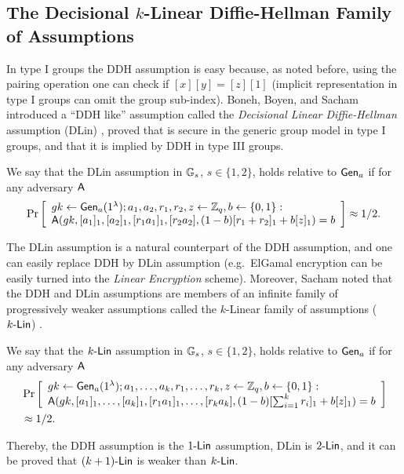 \subsection{The Decisional $k$-Linear Diffie-Hellman Family of Assumptions}
In type I groups the DDH assumption is easy because, as noted before, using the pairing operation one can check if $[x][y]=[z][1]$ (implicit representation in type I groups can omit the group sub-index). Boneh, Boyen, and Sacham introduced a ``DDH like'' assumption called the \emph{Decisional Linear Diffie-Hellman} assumption (DLin) \cite{C:BonBoySha04}, proved that is secure in the generic group model in type I groups, and that it is implied by DDH in type III groups. 

\begin{definition}
We say that the DLin assumption in $\mathbb{G}_s$, $s\in\{1,2\}$, holds relative to $\mathsf{Gen}_a$ if for any adversary $\mathsf{A}$
$$
\Pr\left[\begin{array}{l}
gk\gets\mathsf{Gen}_a(1^\lambda);a_1,a_2,r_1,r_2,z\gets\mathbb{Z}_q,b\gets\{0,1\}:\\
\mathsf{A}(gk,[a_1]_1,[a_2]_1,[r_1a_1]_1,[r_2a_2],(1-b)[r_1+r_2]_1+b[z]_1)=b
\end{array}\right]\approx 1/2.
$$
\end{definition}

The DLin assumption is a natural counterpart of the DDH assumption, and one can easily replace DDH by DLin assumption (e.g.~ElGamal encryption can be easily turned into the \emph{Linear Encryption} scheme). Moreover, Sacham noted that  the DDH and DLin assumptions are members of an infinite family of progressively weaker assumptions called the $k$-Linear family of assumptions ($k\mbox{-}\mathsf{Lin}$) \cite{EPRINT:Shacham07a}.

\begin{definition}
We say that the $k\mbox{-}\mathsf{Lin}$ assumption in $\mathbb{G}_s$, $s\in\{1,2\}$, holds relative to $\mathsf{Gen}_a$ if for any adversary $\mathsf{A}$
\begin{align*}
&\Pr\left[\begin{array}{l}
gk\gets\mathsf{Gen}_a(1^\lambda);a_1,\ldots,a_k,r_1,\ldots,r_k,z\gets\mathbb{Z}_q,b\gets\{0,1\}:\\
\mathsf{A}(gk,[a_1]_1,\ldots,[a_k]_1,[r_1a_1]_1,\ldots,[r_ka_k],(1-b)[\sum_{i=1}^k r_i]_1+b[z]_1)=b
\end{array}\right]\\
&\approx 1/2.
\end{align*}
\end{definition}

Thereby, the DDH assumption is the $1\mbox{-}\mathsf{Lin}$ assumption, DLin is $2\mbox{-}\mathsf{Lin}$, and it can be proved that $(k+1)\mbox{-}\mathsf{Lin}$ is weaker than $k\mbox{-}\mathsf{Lin}$.
